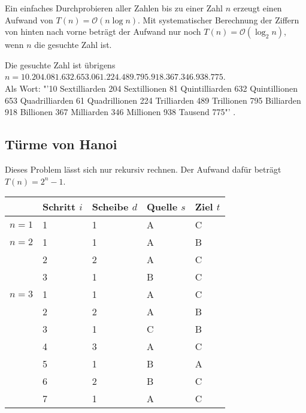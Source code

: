 Ein einfaches Durchprobieren aller Zahlen bis zu einer Zahl $n$ erzeugt einen Aufwand von $T(n)=\mathcal{O}(n\log n)$. Mit systematischer Berechnung der Ziffern von hinten nach vorne beträgt der Aufwand nur noch $T(n)=\mathcal{O}(\log_2 n)$, wenn $n$ die gesuchte Zahl ist.

Die gesuchte Zahl ist übrigens $n=10.204.081.632.653.061.224.489.795.918.367.346.938.775$. \\
Als Wort: "'10 Sextilliarden 204 Sextillionen 81 Quintilliarden 632 Quintillionen 653 Quadrilliarden 61 Quadrillionen 224 Trilliarden 489 Trillionen 795 Billiarden 918 Billionen 367 Milliarden 346 Millionen 938 Tausend 775"' \smiley{}.

\subsection{Türme von Hanoi}

\begin{center}
\end{center}

Dieses Problem lässt sich nur rekursiv rechnen. Der Aufwand dafür beträgt $T(n)=2^n-1$.

\begin{center}
	\begin{longtable}{p{1cm}|p{2cm}|p{2cm}|p{2cm}|p{2cm}}
		\rowcolor{lightgray}
		& \textbf{Schritt} $i$ & \textbf{Scheibe} $d$ & \textbf{Quelle} $s$ & \textbf{Ziel} $t$ \\
		\hline
		$n=1$ & 1 & 1 & A & C \\
		\hline\hline
		$n=2$ & 1 & 1 & A & B \\
		\hline
		 & 2 & 2 & A & C \\
		 \hline
		 & 3 & 1 & B & C \\
		 \hline\hline
		 $n=3$ & 1 & 1 & A & C \\
		 \hline
		  & 2 & 2 & A & B \\
		  \hline
		  & 3 & 1 & C & B \\
		  \hline
		  & 4 & 3 & A & C \\
		  \hline
		  & 5 & 1 & B & A \\
		  \hline
		  & 6 & 2 & B & C \\
		  \hline
		  & 7 & 1 & A & C
	\end{longtable}
\end{center}

